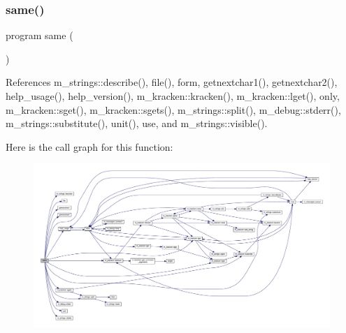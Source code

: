 \subsubsection{\texorpdfstring{same()}{same()}}
{\footnotesize\ttfamily program same (\begin{DoxyParamCaption}{ }\end{DoxyParamCaption})}



References m\+\_\+strings\+::describe(), file(), form, getnextchar1(), getnextchar2(), help\+\_\+usage(), help\+\_\+version(), m\+\_\+kracken\+::kracken(), m\+\_\+kracken\+::lget(), only, m\+\_\+kracken\+::sget(), m\+\_\+kracken\+::sgets(), m\+\_\+strings\+::split(), m\+\_\+debug\+::stderr(), m\+\_\+strings\+::substitute(), unit(), use, and m\+\_\+strings\+::visible().

Here is the call graph for this function\+:
\nopagebreak
\begin{figure}[H]
\begin{center}
\leavevmode
\includegraphics[width=350pt]{__cmp_8f90_a099b4c5d750b7bb116895dc4fca1bf38_cgraph}
\end{center}
\end{figure}
